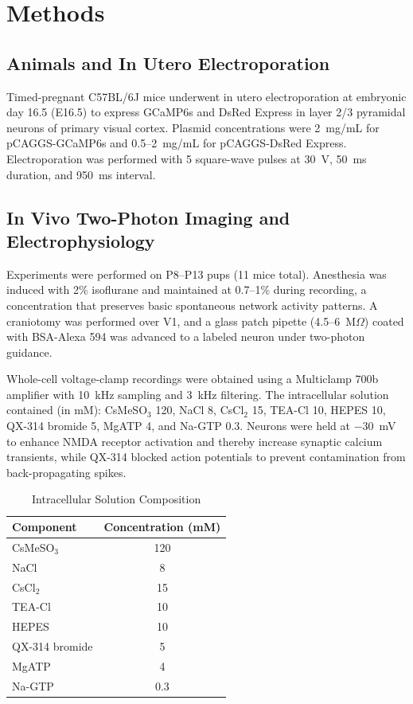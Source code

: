 \documentclass[11pt]{article}
\begin{document}
\section{Methods}

\subsection{Animals and In Utero Electroporation}

Timed-pregnant C57BL/6J mice underwent in utero electroporation at embryonic day 16.5 (E16.5) to express GCaMP6s \citep{chen2012ultrasensitive} and DsRed Express in layer 2/3 pyramidal neurons of primary visual cortex. Plasmid concentrations were 2~mg/mL for pCAGGS-GCaMP6s and 0.5--2~mg/mL for pCAGGS-DsRed Express. Electroporation was performed with 5 square-wave pulses at 30~V, 50~ms duration, and 950~ms interval.

\subsection{In Vivo Two-Photon Imaging and Electrophysiology}

Experiments were performed on P8--P13 pups (11 mice total). Anesthesia was induced with 2\% isoflurane and maintained at 0.7--1\% during recording, a concentration that preserves basic spontaneous network activity patterns. A craniotomy was performed over V1, and a glass patch pipette (4.5--6~M$\Omega$) coated with BSA-Alexa 594 was advanced to a labeled neuron under two-photon guidance.

Whole-cell voltage-clamp recordings were obtained using a Multiclamp 700b amplifier with 10~kHz sampling and 3~kHz filtering. The intracellular solution contained (in mM): CsMeSO$_3$ 120, NaCl 8, CsCl$_2$ 15, TEA-Cl 10, HEPES 10, QX-314 bromide 5, MgATP 4, and Na-GTP 0.3. Neurons were held at $-30$~mV to enhance NMDA receptor activation and thereby increase synaptic calcium transients, while QX-314 blocked action potentials to prevent contamination from back-propagating spikes.

\begin{table}[ht]
\centering
\caption{Intracellular Solution Composition}
\label{tab:ics}
\begin{tabular}{lc}
\toprule
\textbf{Component} & \textbf{Concentration (mM)} \\
\midrule
CsMeSO$_3$ & 120 \\
NaCl & 8 \\
CsCl$_2$ & 15 \\
TEA-Cl & 10 \\
HEPES & 10 \\
QX-314 bromide & 5 \\
MgATP & 4 \\
Na-GTP & 0.3 \\
\bottomrule
\end{tabular}
\end{table}
\end{document}
